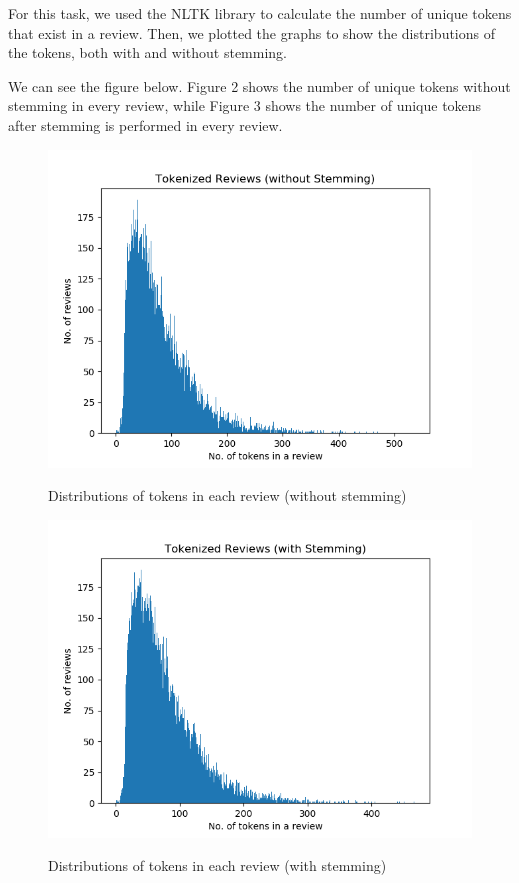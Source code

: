 For this task, we used the NLTK library to calculate the number of unique tokens that exist in a review. Then, we plotted the graphs to show the distributions of the tokens, both with and without stemming.

We can see the figure below. Figure 2 shows the number of unique tokens without stemming in every review, while Figure 3 shows the number of unique tokens after stemming is performed in every review.

\begin{figure}
    \centering
    \caption{Distributions of tokens in each review (without stemming)}
    \includegraphics[scale=054]{figures/token_review.png}
    \label{fig:tokenized_review}
\end{figure}

\begin{figure}
    \centering
    \caption{Distributions of tokens in each review (with stemming)}
    \includegraphics[scale=0.5]{figures/stem_review.png}
    \label{fig:stemmed_token_review}
\end{figure}

